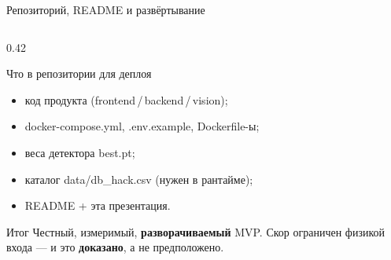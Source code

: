\documentclass[aspectratio=169,10pt]{beamer}
\newcommand{\code}[1]{{\ttfamily\small\color{slate}#1}}
\newcommand{\hl}[1]{{\bfseries\color{accent}#1}}
\newcommand{\hg}[1]{{\bfseries\color{good}#1}}
\begin{document}
\begin{frame}{Репозиторий, README и развёртывание}
\begin{columns}[T,onlytextwidth]
\begin{column}{0.42\textwidth}
\begin{block}{Что в репозитории для деплоя}
        \begin{itemize}\setlength\itemsep{2pt}
          \item код продукта (frontend\,/\,backend\,/\,vision);
          \item \code{docker-compose.yml}, \code{.env.example}, Dockerfile-ы;
          \item веса детектора \code{best.pt};
          \item каталог \code{data/db\_hack.csv} (нужен в рантайме);
          \item README + эта презентация.
        \end{itemize}
      \end{block}
      \vspace{0.3em}
      \begin{block}{Итог}\footnotesize
        Честный, измеримый, \hg{разворачиваемый} MVP. Скор ограничен
        физикой входа — и это \hl{доказано}, а не предположено.
      \end{block}
    \end{column}
  \end{columns}
\end{frame}
\end{document}
